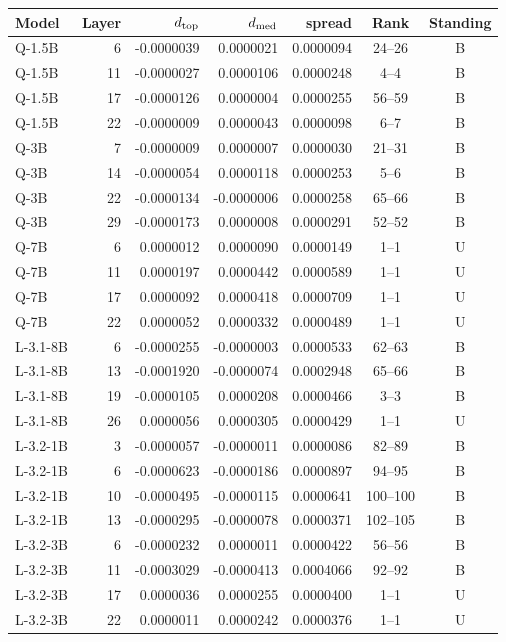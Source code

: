 \begin{tabular}{lr rrrcc}
\toprule
Model & Layer & $d_{\rm top}$ & $d_{\rm med}$ & spread & Rank & Standing \\
\midrule
Q-1.5B & 6 & -0.0000039 & 0.0000021 & 0.0000094 & 24--26 & B \\
Q-1.5B & 11 & -0.0000027 & 0.0000106 & 0.0000248 & 4--4 & B \\
Q-1.5B & 17 & -0.0000126 & 0.0000004 & 0.0000255 & 56--59 & B \\
Q-1.5B & 22 & -0.0000009 & 0.0000043 & 0.0000098 & 6--7 & B \\
Q-3B & 7 & -0.0000009 & 0.0000007 & 0.0000030 & 21--31 & B \\
Q-3B & 14 & -0.0000054 & 0.0000118 & 0.0000253 & 5--6 & B \\
Q-3B & 22 & -0.0000134 & -0.0000006 & 0.0000258 & 65--66 & B \\
Q-3B & 29 & -0.0000173 & 0.0000008 & 0.0000291 & 52--52 & B \\
Q-7B & 6 & 0.0000012 & 0.0000090 & 0.0000149 & 1--1 & U \\
Q-7B & 11 & 0.0000197 & 0.0000442 & 0.0000589 & 1--1 & U \\
Q-7B & 17 & 0.0000092 & 0.0000418 & 0.0000709 & 1--1 & U \\
Q-7B & 22 & 0.0000052 & 0.0000332 & 0.0000489 & 1--1 & U \\
L-3.1-8B & 6 & -0.0000255 & -0.0000003 & 0.0000533 & 62--63 & B \\
L-3.1-8B & 13 & -0.0001920 & -0.0000074 & 0.0002948 & 65--66 & B \\
L-3.1-8B & 19 & -0.0000105 & 0.0000208 & 0.0000466 & 3--3 & B \\
L-3.1-8B & 26 & 0.0000056 & 0.0000305 & 0.0000429 & 1--1 & U \\
L-3.2-1B & 3 & -0.0000057 & -0.0000011 & 0.0000086 & 82--89 & B \\
L-3.2-1B & 6 & -0.0000623 & -0.0000186 & 0.0000897 & 94--95 & B \\
L-3.2-1B & 10 & -0.0000495 & -0.0000115 & 0.0000641 & 100--100 & B \\
L-3.2-1B & 13 & -0.0000295 & -0.0000078 & 0.0000371 & 102--105 & B \\
L-3.2-3B & 6 & -0.0000232 & 0.0000011 & 0.0000422 & 56--56 & B \\
L-3.2-3B & 11 & -0.0003029 & -0.0000413 & 0.0004066 & 92--92 & B \\
L-3.2-3B & 17 & 0.0000036 & 0.0000255 & 0.0000400 & 1--1 & U \\
L-3.2-3B & 22 & 0.0000011 & 0.0000242 & 0.0000376 & 1--1 & U \\
\bottomrule
\end{tabular}
